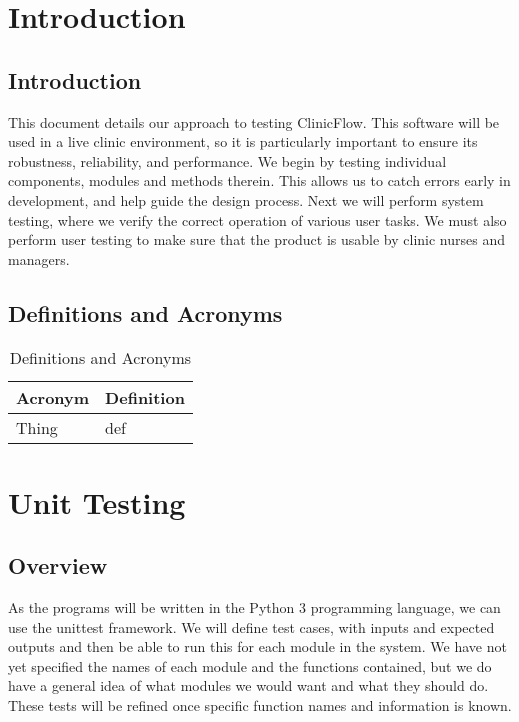 \documentclass[12pt]{article}
\begin{document}
\section{Introduction}

\subsection{Introduction}
This document details our approach to testing ClinicFlow. This software will be used in a live clinic environment, so it is particularly important to ensure its robustness, reliability, and performance. We begin by testing individual components, modules and methods therein. This allows us to catch errors early in development, and help guide the design process. Next we will perform system testing, where we verify the correct operation of various user tasks. We must also perform user testing to make sure that the product is usable by clinic nurses and managers.

\subsection{Definitions and Acronyms} 
\begin{center}
\begin{longtable}{>{\raggedright\arraybackslash}p{}>{\raggedright\arraybackslash}p{}}
\caption{Definitions and Acronyms}\label{Table_Acronyms}\\
\toprule

\bf Acronym & \bf Definition\\\midrule
Thing & def\\\midrule

\bottomrule
\end{longtable}
\end{center}

\section{Unit Testing}
\subsection{Overview}
	As the programs will be written in the Python 3 programming language, we can use the unittest framework. We will define test cases, with inputs and expected outputs and then be able to run this for each module in the system. We have not yet specified the names of each module and the functions contained, but we do have a general idea of what modules we would want and what they should do. These tests will be refined once specific function names and information is known.
\end{document}
